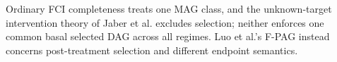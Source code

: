 Ordinary FCI completeness treats one MAG class, and the unknown-target intervention theory of Jaber et al. excludes selection; neither enforces one common basal selected DAG across all regimes.  Luo et al.'s F-PAG instead concerns post-treatment selection and different endpoint semantics.